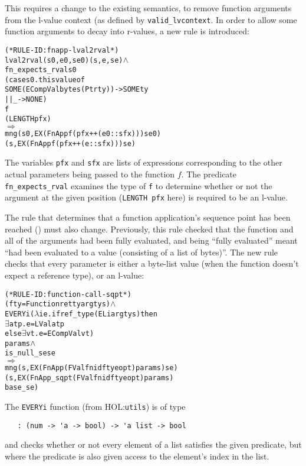 \documentclass[11pt]{article}
\newcommand{\HOLfile}[1]{HOL:\texttt{#1}}
\begin{document}
This requires a change to the existing semantics, to remove function
arguments from the l-value context (as defined by
\texttt{valid_lvcontext}.
In order to allow some function arguments to decay into r-values, a
new rule is introduced:
\begin{center}
\begin{minipage}{\textwidth}
%
\begin{alltt}
(* RULE-ID: fnapp-lval2rval *)
     lval2rval (s0,e0,se0) (s,e,se) \(\land\)
     fn_expects_rval s0
       (case s0.thisvalue of
           SOME (ECompVal bytes (Ptr ty)) -> SOME ty
        || _ -> NONE)
       f
       (LENGTH pfx)
   \(\Rightarrow\)
     mng (s0, EX (FnApp f (pfx ++ (e0 :: sfx))) se0)
         (s, EX (FnApp f (pfx ++ (e :: sfx))) se)
\end{alltt}
\end{minipage}
\end{center}
The variables \texttt{pfx} and \texttt{sfx} are lists of expressions
corresponding to the other actual parameters being passed to the
function $f$.  The predicate \texttt{fn_expects_rval} examines the
type of \texttt{f} to determine whether or not the argument at the
given position (\texttt{LENGTH~pfx} here) is required to be an l-value.

The rule that determines that a function application's sequence point
has been reached () must also change.
Previously, this rule checked that the function and all of the
arguments had been fully evaluated, and being ``fully evaluated''
meant ``had been evaluated to a value (consisting of a list of
bytes)''.  The new rule checks that every parameter is either a
byte-list value (when the function doesn't expect a reference type),
or an l-value:
\begin{center}
\begin{minipage}{\textwidth}
%
\begin{alltt}
(* RULE-ID: function-call-sqpt *)
     (fty = Function retty argtys) \(\land\)
     EVERYi (\(\lambda\)i e. if ref_type (EL i argtys) then
                     \(\exists\)a t p. e = LVal a t p
                   else \(\exists\)v t. e = ECompVal v t)
            params \(\land\)
     is_null_se se
   \(\Rightarrow\)
     mng (s, EX (FnApp (FVal fnid fty eopt) params) se)
         (s, EX (FnApp_sqpt (FVal fnid fty eopt) params)
                base_se)
\end{alltt}
\end{minipage}
\end{center}
The \texttt{EVERYi} function (from \HOLfile{utils}) is of type
\begin{verbatim}
   : (num -> 'a -> bool) -> 'a list -> bool
\end{verbatim}
and checks whether or not every element of a list satisfies the given
predicate, but where the predicate is also given access to the
element's index in the list.
\end{document}
